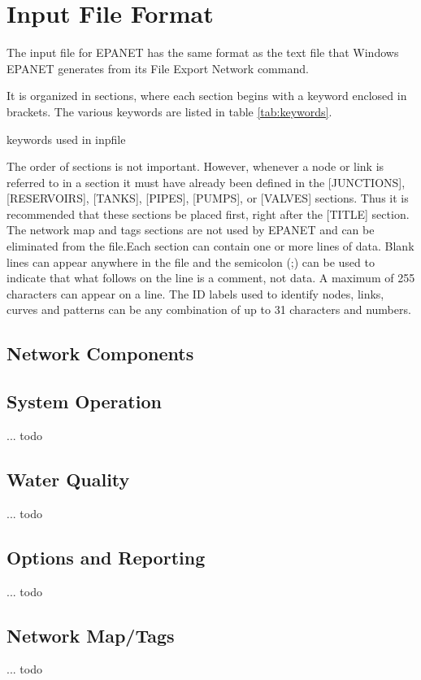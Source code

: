 \chapter{Input File Format}
The input file for EPANET has the same format as the text file that
Windows EPANET generates from its File Export  Network command. 

It is organized in sections, where each section begins with a keyword enclosed in
brackets. The various keywords are listed in table \ref{tab:keywords}.



\begin{table}[tbp]
  
  \caption{keywords used in inpfile}
  \label{tab:keywords}

\end{table}

The order of sections is not important. However, whenever a node or link is referred
to in a section it must have already been defined in the [JUNCTIONS],
[RESERVOIRS], [TANKS], [PIPES], [PUMPS], or [VALVES] sections. Thus it is
recommended that these sections be placed first, right after the [TITLE] section. The
network map and tags sections are not used by EPANET and can be
eliminated from the file.Each section can contain one or more lines of data. Blank lines can appear anywhere
in the file and the semicolon (;) can be used to indicate that what follows on the line
is a comment, not data. A maximum of 255 characters can appear on a line. The ID
labels used to identify nodes, links, curves and patterns can be any combination of up
to 31 characters and numbers.

\section{Network Components}

  
  



\section{System Operation}
  ... todo
\section{Water Quality}
  ... todo
\section{Options and Reporting}
  ... todo
\section{Network Map/Tags}
  ... todo